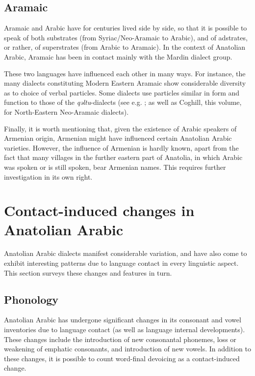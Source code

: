 \documentclass[output=paper]{langsci/langscibook}
\begin{document}
\subsection{Aramaic}
Aramaic and Arabic have for centuries lived side by side, so that it is possible to speak of both substrates (from Syriac/Neo-Aramaic to Arabic), and of adstrates, or rather, of superstrates (from Arabic to Aramaic). In the context of Anatolian Arabic, Aramaic has been in contact mainly with the Mardin dialect group. 

These two languages have influenced each other in many ways. For instance, the many dialects constituting Modern Eastern Aramaic show considerable diversity as to choice of verbal particles. Some dialects use particles similar in form and function to those of the \textit{qəltu}-dialects (see e.g. \citealt{Jastrow1985}; as well as Coghill, this volume, for North-Eastern Neo-Aramaic dialects).

Finally, it is worth mentioning that, given the existence of Arabic speakers of Armenian origin, Armenian might have influenced certain Anatolian Arabic varieties. However, the influence of Armenian is hardly known, apart from the fact that many villages in the further eastern part of Anatolia, in which Arabic was spoken or is still spoken, bear Armenian names. This requires further investigation in its own right.

\section{Contact-induced changes in Anatolian Arabic}

Anatolian Arabic dialects manifest considerable variation, and have also come to exhibit interesting patterns due to language contact in every linguistic aspect. This section surveys these changes and features in turn.

\subsection{Phonology}

Anatolian Arabic has undergone significant changes in its consonant and vowel inventories due to language contact (as well as language internal developments). These changes include the introduction of new consonantal phonemes, loss or weakening of emphatic consonants, and introduction of new vowels. In addition to these changes, it is possible to count word-final devoicing as a contact-induced change.
\end{document}
